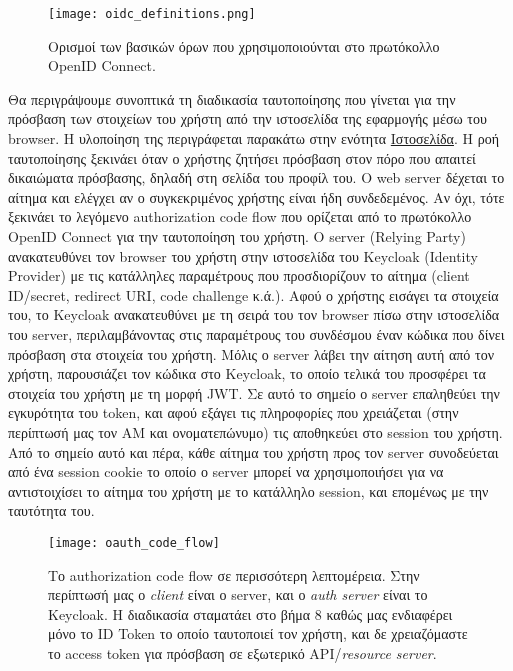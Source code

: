 \documentclass[../thesis.tex]{subfiles}
\begin{document}
\begin{figure}[!ht]
    \texttt{[image: oidc\_definitions.png]}
    \centering
    \caption{Ορισμοί των βασικών όρων που χρησιμοποιούνται στο πρωτόκολλο OpenID Connect\cite{oidc_faq}.}
\end{figure}

Θα περιγράψουμε συνοπτικά τη διαδικασία ταυτοποίησης που γίνεται για την πρόσβαση των στοιχείων του χρήστη από την ιστοσελίδα της εφαρμογής μέσω του browser.
Η υλοποίηση της περιγράφεται παρακάτω στην ενότητα \hyperref[sec:website]{Ιστοσελίδα}.
Η ροή ταυτοποίησης ξεκινάει όταν ο χρήστης ζητήσει πρόσβαση στον πόρο που απαιτεί δικαιώματα πρόσβασης, δηλαδή στη σελίδα του προφίλ του.
Ο web server δέχεται το αίτημα και ελέγχει αν ο συγκεκριμένος χρήστης είναι ήδη συνδεδεμένος.
Αν όχι, τότε ξεκινάει το λεγόμενο authorization code flow που ορίζεται από το πρωτόκολλο OpenID Connect για την ταυτοποίηση του χρήστη.
Ο server (Relying Party) ανακατευθύνει τον browser του χρήστη στην ιστοσελίδα του Keycloak (Identity Provider) με τις κατάλληλες παραμέτρους που προσδιορίζουν το αίτημα (client ID/secret, redirect URI, code challenge κ.ά.).
Αφού ο χρήστης εισάγει τα στοιχεία του, το Keycloak ανακατευθύνει με τη σειρά του τον browser πίσω στην ιστοσελίδα του server, περιλαμβάνοντας στις παραμέτρους του συνδέσμου έναν κώδικα που δίνει πρόσβαση στα στοιχεία του χρήστη.
Μόλις ο server λάβει την αίτηση αυτή από τον χρήστη, παρουσιάζει τον κώδικα στο Keycloak, το οποίο τελικά του προσφέρει τα στοιχεία του χρήστη με τη μορφή JWT.
Σε αυτό το σημείο ο server επαληθεύει την εγκυρότητα του token, και αφού εξάγει τις πληροφορίες που χρειάζεται (στην περίπτωσή μας τον ΑΜ και ονοματεπώνυμο) τις αποθηκεύει στο session του χρήστη.
Από το σημείο αυτό και πέρα, κάθε αίτημα του χρήστη προς τον server συνοδεύεται από ένα session cookie το οποίο ο server μπορεί να χρησιμοποιήσει για να αντιστοιχίσει το αίτημα του χρήστη με το κατάλληλο session, και επομένως με την ταυτότητα του.

\begin{figure}[!ht]
    \texttt{[image: oauth\_code\_flow]}
    \centering
    \caption{Το authorization code flow σε περισσότερη λεπτομέρεια. Στην περίπτωσή μας ο \textit{client} είναι ο server, και ο \textit{auth server} είναι το Keycloak. H διαδικασία σταματάει στο βήμα 8 καθώς μας ενδιαφέρει μόνο το ID Token το οποίο ταυτοποιεί τον χρήστη, και δε χρειαζόμαστε το access token για πρόσβαση σε εξωτερικό API/\textit{resource server}\cite{okta_code_flow}.}
\end{figure}
\end{document}
